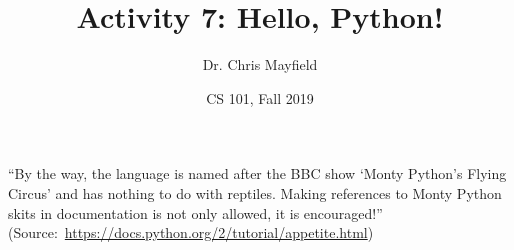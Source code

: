 \documentclass[12pt]{article}
\title{Activity 7: Hello, Python!}
\author{Dr. Chris Mayfield}
\date{CS 101, Fall 2019}
\begin{document}
\maketitle

``By the way, the language is named after the BBC show `Monty Python's Flying Circus' and has nothing to do with reptiles.
Making references to Monty Python skits in documentation is not only allowed, it is encouraged!''
(Source:~\url{https://docs.python.org/2/tutorial/appetite.html})



\end{document}
